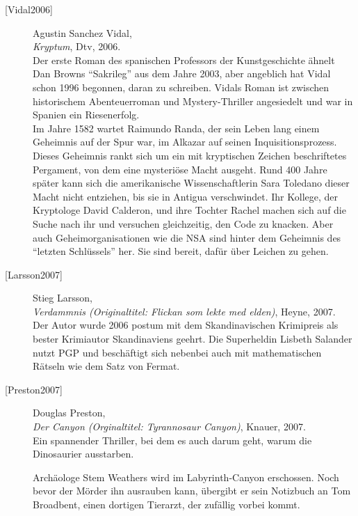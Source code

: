 \begin{refsegment}
\begin{description}
\newpage
\item[\textrm{[Vidal2006]}] 
    Agustin Sanchez Vidal, \\
    {\em Kryptum}, Dtv, 2006. \\
    Der erste Roman des spanischen Professors der Kunstgeschichte ähnelt
    Dan Browns "`Sakrileg"' aus dem Jahre 2003, aber angeblich hat Vidal schon
    1996 begonnen, daran zu schreiben. Vidals Roman ist zwischen historischem
    Abenteuerroman und Mystery-Thriller angesiedelt und war in Spanien ein
    Riesenerfolg.\\
    Im Jahre 1582 wartet Raimundo Randa, der sein Leben lang einem Geheimnis
    auf der Spur war, im Alkazar auf seinen Inquisitionsprozess.
    Dieses Geheimnis rankt sich um ein mit kryptischen Zeichen beschriftetes
    Pergament, von dem eine mysteriöse Macht ausgeht.
    Rund 400 Jahre später kann sich die amerikanische Wissenschaftlerin Sara
    Toledano dieser Macht nicht entziehen, bis sie in Antigua verschwindet.
    Ihr Kollege, der Kryptologe David Calderon, und ihre Tochter Rachel machen
    sich auf die Suche nach ihr und versuchen gleichzeitig, den Code zu knacken.
    Aber auch Geheimorganisationen wie die NSA sind hinter dem
    Geheimnis des "`letzten Schlüssels"' her. Sie sind bereit, dafür
    über Leichen zu gehen.\\


\item[\textrm{[Larsson2007]}] 
    Stieg Larsson, \\
    {\em Verdammnis (Originaltitel: Flickan som lekte med elden)}, Heyne, 2007. \\
    Der Autor wurde 2006 postum mit dem Skandinavischen Krimipreis als bester
    Krimiautor Skandinaviens geehrt. Die Superheldin Lisbeth Salander nutzt PGP
    und beschäftigt sich nebenbei auch mit mathematischen Rätseln wie dem Satz
    von Fermat.\\


\item[\textrm{[Preston2007]}] 
    Douglas Preston, \\
    {\em Der Canyon (Orginaltitel: Tyrannosaur Canyon)}, Knauer, 2007. \\
    Ein spannender Thriller, bei dem es auch darum geht, warum die Dinosaurier
    ausstarben.

    Archäologe Stem Weathers wird im Labyrinth-Canyon erschossen. Noch bevor der
    Mörder ihn ausrauben kann, übergibt er sein Notizbuch an Tom Broadbent, einen
    dortigen Tierarzt, der zufällig vorbei kommt.


\end{description}
\end{refsegment}
